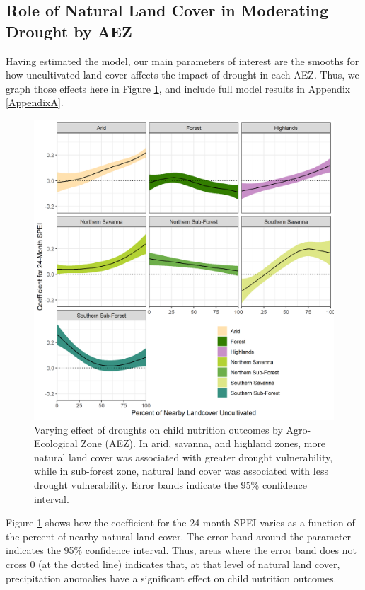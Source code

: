 \documentclass{article}
\begin{document}
\subsection{Role of Natural Land Cover in Moderating Drought by AEZ}

Having estimated the model, our main parameters of interest are the smooths for how uncultivated land cover affects the impact of drought in each AEZ.  Thus, we graph those effects here in Figure \ref{fig:naturaleffect}, and include full model results in Appendix \ref{AppendixA}.

\begin{figure}[h!]
	\begin{center}
	\includegraphics[width=0.8\linewidth]{AEZ_effects.png}
	\end{center}
	\caption{Varying effect of droughts on child nutrition outcomes by Agro-Ecological Zone (AEZ).  In arid, savanna, and highland zones, more natural land cover was associated with greater drought vulnerability, while in sub-forest zone, natural land cover was associated with less drought vulnerability.  Error bands indicate the 95\% confidence interval.}
	\label{fig:naturaleffect}
\end{figure}

Figure \ref{fig:naturaleffect} shows how the coefficient for the 24-month SPEI varies as a function of the percent of nearby natural land cover.  The error band around the parameter indicates the 95\% confidence interval.  Thus, areas where the error band does not cross 0 (at the dotted line) indicates that, at that level of natural land cover, precipitation anomalies have a significant effect on child nutrition outcomes.
\end{document}
